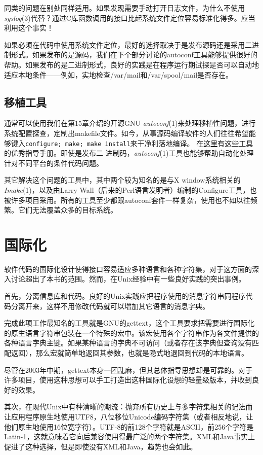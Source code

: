 \documentclass[12pt,oneside]{book}
\begin{document}
\begin{common-format}
同类的问题在别处同样适用。如果发现需要手动打开日志文件，为什么不使用\textit{syslog}(3)代替？通过C库函数调用的接口比起系统文件定位容易标准化得多。应当利用这个事实！

如果必须在代码中使用系统文件定位，最好的选择取决于是发布源码还是采用二进制形式。如果发布的是源码，我们在下个部分讨论的autoconf工具能够提供很好的帮助。如果发布的是二进制形式，良好的实践是在程序运行期试探是否可以自动地适应本地条件——例如，实地检查/var/mail和/var/spool/mail是否存在。

\subsection{移植工具}
通常可以使用我们在第15章介绍的开源GNU \textit{autoconf}(1)来处理移植性问题，进行系统配置探查，定制出makefile文件。如今，从事源码编译软件的人们往往希望能够键入\verb+configure; make; make install+来干净利落地编译。  在\href{http://seul.org/docs/autotut/}{这里}有这些工具的优秀指导手册。即使是发布二
进制码，\textit{autoconf}(1)工具也能够帮助自动化处理针对不同平台的条件代码问题。

其它解决这个问题的工具中，其中两个较为知名的是与X window系统相关的\textit{Imake}(1)，以及由Larry Wall（后来的Perl语言发明者）编制的Configure工具，也被许多项目采用。所有的工具至少都跟autoconf套件一样复杂，使用也不如以往频繁。它们无法覆盖众多的目标系统。

\section{国际化}
软件代码的国际化设计使得接口容易适应多种语言和各种字符集，对于这方面的深入讨论超出了本书的范围。然而，在Unix经验中有一些良好实践的突出事例。

首先，分离信息库和代码。良好的Unix实践应把程序使用的消息字符串同程序代码分离开来，这样不用修改代码就可以增加其它语言的消息字典。

完成此项工作最知名的工具就是GNU的gettext，这个工具要求把需要进行国际化的原生语言字符串包装在一个特殊的宏中。该宏使用各个字符串作为各文件提供的各种语言字典主键。如果某种语言的字典不可访问（或者存在该字典但查询没有匹配返回），那么宏就简单地返回其参数，也就是隐式地退回到代码的本地语言。

尽管在2003年中期，gettext本身一团乱麻，但其总体指导思想却是可靠的。对于许多项目，使用这种思想可以手工打造出这种国际化设想的轻量级版本，并收到良好的效果。

其次，在现代Unix中有种清晰的潮流：抛弃所有历史上与多字符集相关的记法而让应用程序原生地使用UTF8，八位移位Unicode编码字符集（或者相反地说，让他们原生地使用16位宽字符）。UTF-8的前128个字符就是ASCII，前256个字符是Latin-1，这就意味着它向后兼容使用得最广泛的两个字符集。XML和Java事实上促进了这种选择，但是即使没有XML和Java，趋势也会如此。


\end{common-format}
\end{document}
